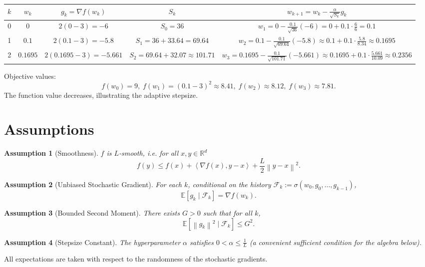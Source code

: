 \documentclass[11pt]{article}
\newtheorem{assumption}{Assumption}
\newcommand{\EE}{\mathbb{E}}
\newcommand{\RR}{\mathbb{R}}
\newcommand{\norm}[1]{\left\|#1\right\|}
\newcommand{\inner}[2]{\left\langle #1,#2 \right\rangle}
\begin{document}
\begin{center}
\begin{tabular}{c|c|c|c|c}
$k$ & $w_k$ & $g_k= \nabla f(w_k)$ & $S_k$ & $w_{k+1}=w_k-\frac{\alpha}{\sqrt{S_k}}g_k$ \\ \hline
0 & $0$ & $2(0-3)=-6$ & $S_0=36$ & $w_1=0-\frac{0.1}{\sqrt{36}}(-6)=0+0.1\cdot\frac{6}{6}=0.1$\\[4pt]
1 & $0.1$ & $2(0.1-3)=-5.8$ & $S_1=36+33.64=69.64$ & $w_2=0.1-\frac{0.1}{\sqrt{69.64}}(-5.8)\approx0.1+0.1\cdot\frac{5.8}{8.34}\approx0.1695$\\[4pt]
2 & $0.1695$ & $2(0.1695-3)=-5.661$ & $S_2=69.64+32.07\approx101.71$ &
$w_3=0.1695-\frac{0.1}{\sqrt{101.71}}(-5.661)\approx0.1695+0.1\cdot\frac{5.661}{10.09}\approx0.2356$
\end{tabular}
\end{center}
Objective values:
\[
f(w_0)=9,\; f(w_1)=(0.1-3)^2\approx8.41,\;
f(w_2)\approx8.12,\; f(w_3)\approx7.81 .
\]
The function value decreases, illustrating the adaptive stepsize.

\newpage
\section*{Assumptions}
\begin{assumption}[Smoothness]\label{ass:smooth}
$f$ is $L$‑smooth, i.e. for all $x,y\in\RR^{d}$
\[
f(y)\le f(x)+\inner{\nabla f(x)}{y-x}+\frac{L}{2}\norm{y-x}^2 .
\]
\end{assumption}
\begin{assumption}[Unbiased Stochastic Gradient]\label{ass:unbiased}
For each $k$, conditional on the history $\mathcal{F}_k:=\sigma(w_0,g_0,\dots,g_{k-1})$,
\[
\EE\!\left[g_k\mid\mathcal{F}_k\right]=\nabla f(w_k).
\]
\end{assumption}
\begin{assumption}[Bounded Second Moment]\label{ass:bounded}
There exists $G>0$ such that for all $k$,
\[
\EE\!\left[\norm{g_k}^2\mid\mathcal{F}_k\right]\le G^2 .
\]
\end{assumption}
\begin{assumption}[Stepsize Constant]\label{ass:alpha}
The hyperparameter $\alpha$ satisfies $0<\alpha\le \frac{1}{L}$ (a convenient sufficient condition for the algebra below).
\end{assumption}

All expectations are taken with respect to the randomness of the stochastic gradients.
\end{document}
